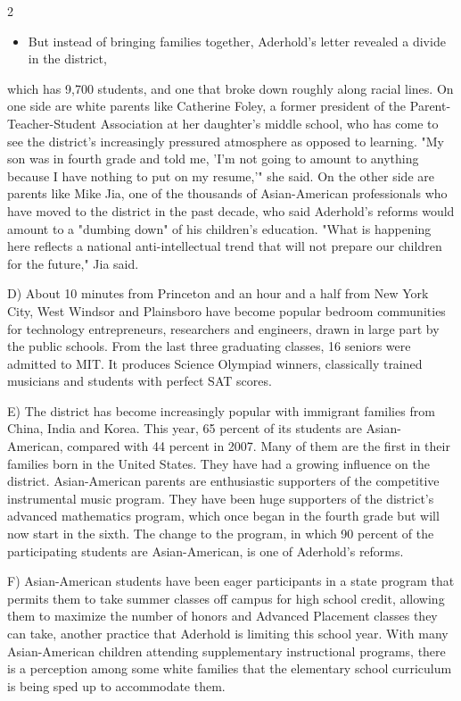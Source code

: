 \documentclass[UTF8,11pt]{ctexart}
\begin{document}
2


\begin{itemize}[leftmargin=2em,itemsep=.2em,topsep=.4em]\item[C.] But instead of bringing families together, Aderhold's letter revealed a divide in the district,
\end{itemize}

which has 9,700 students, and one that broke down roughly along racial lines. On one side are white parents like Catherine Foley, a former president of the Parent-Teacher-Student Association at her daughter's middle school, who has come to see the district's increasingly pressured atmosphere as opposed to learning. "My son was in fourth grade and told me, 'I'm not going to amount to anything because I have nothing to put on my resume,'" she said. On the other side are parents like Mike Jia, one of the thousands of Asian-American professionals who have moved to the district in the past decade, who said Aderhold's reforms would amount to a "dumbing down" of his children's education. "What is happening here reflects a national anti-intellectual trend that will not prepare our children for the future," Jia said.


D) About 10 minutes from Princeton and an hour and a half from New York City, West Windsor and Plainsboro have become popular bedroom communities for technology entrepreneurs, researchers and engineers, drawn in large part by the public schools. From the last three graduating classes, 16 seniors were admitted to MIT. It produces Science Olympiad winners, classically trained musicians and students with perfect SAT scores.


E) The district has become increasingly popular with immigrant families from China, India and Korea. This year, 65 percent of its students are Asian-American, compared with 44 percent in 2007. Many of them are the first in their families born in the United States. They have had a growing influence on the district. Asian-American parents are enthusiastic supporters of the competitive instrumental music program. They have been huge supporters of the district's advanced mathematics program, which once began in the fourth grade but will now start in the sixth. The change to the program, in which 90 percent of the participating students are Asian-American, is one of Aderhold's reforms.


F) Asian-American students have been eager participants in a state program that permits them to take summer classes off campus for high school credit, allowing them to maximize the number of honors and Advanced Placement classes they can take, another practice that Aderhold is limiting this school year. With many Asian-American children attending supplementary instructional programs, there is a perception among some white families that the elementary school curriculum is being sped up to accommodate them.
\end{document}
